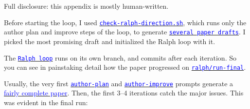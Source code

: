 \documentclass[12pt]{article}
\begin{document}
Full disclosure: this appendix is mostly human-written.

Before starting the loop, I used \href{https://github.com/chenandrewy/ralph-wiggum-asset-pricing/blob/main/check-ralph-direction.sh}{\textcolor{blue}{\texttt{check-ralph-direction.sh}}}, which runs only the author plan and improve steps of the loop, to generate \href{https://github.com/chenandrewy/ralph-wiggum-asset-pricing/tree/human-preface/ralph-garage/check-direction}{\textcolor{blue}{\texttt{several paper drafts}}}. I picked the most promising draft and initialized the Ralph loop with it.

The \href{https://github.com/chenandrewy/ralph-wiggum-asset-pricing/blob/main/ralph/ralph-loop.sh}{\textcolor{blue}{\texttt{Ralph loop}}} runs on its own branch, and commits after each iteration. So you can see in painstaking detail how the paper progressed on \href{https://github.com/chenandrewy/ralph-wiggum-asset-pricing/commits/ralph/run-final/}{\textcolor{blue}{\texttt{ralph/run-final}}}.

Usually, the very first \href{https://github.com/chenandrewy/ralph-wiggum-asset-pricing/blob/main/ralph/author-plan.py}{\textcolor{blue}{\texttt{author-plan}}} and \href{https://github.com/chenandrewy/ralph-wiggum-asset-pricing/blob/main/ralph/author-improve.py}{\textcolor{blue}{\texttt{author-improve}}} prompts generate a \href{https://github.com/chenandrewy/ralph-wiggum-asset-pricing/blob/final-pass/ralph-garage/history/001-paper.pdf}{\textcolor{blue}{fairly complete paper}}. Then, the first 3--4 iterations catch the major issues. This was evident in the final run:
\end{document}
